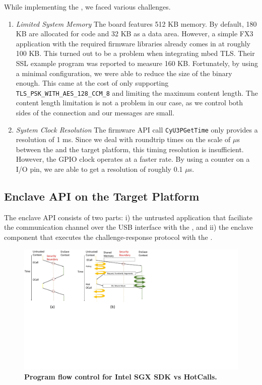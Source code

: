   
 While implementing the \device, we faced various challenges.

\begin{enumerate}
  \item \emph{Limited System Memory} The board features 512 KB memory. By default, 180 KB are allocated for code and 32 KB as a data area. However, a simple FX3 application with the required firmware libraries already comes in at roughly 100 KB. This turned out to be a problem when integrating mbed TLS. Their SSL example program was reported to measure 160 KB. Fortunately, by using a minimal configuration, we were able to reduce the size of the binary enough. This came at the cost of only supporting \texttt{TLS\_PSK\_WITH\_AES\_128\_CCM\_8} and limiting the maximum content length. The content length limitation is not a problem in our case, as we control both sides of the connection and our messages are small.

 \item \emph{System Clock Resolution} The firmware API call \texttt{CyU3PGetTime} only provides a resolution of 1 ms. Since we deal with roundtrip times on the scale of $\mu$s between the \device and the target platform, this timing resolution is insufficient. However, the GPIO clock operates at a faster rate. By using a counter on a I/O pin, we are able to get a resolution of roughly 0.1 $\mu$s.
  
\end{enumerate}

\subsection{\name Enclave API on the Target Platform} 

The \name enclave API consists of two parts: i) the untrusted application that faciliate the communication channel over the USB interface with the \device, and ii) the enclave component that executes the challenge-response protocol with the \device.

\begin{figure}[t]
  \centering
    \includegraphics[width=\linewidth]{chapters/ProximiTEE/images/hotcalls.pdf}
    \caption[Program flow control for Intel SGX SDK vs HotCalls]{\textbf{Program flow control for Intel SGX SDK vs HotCalls.} }
    \label{fig:hotcalls}
\end{figure}


